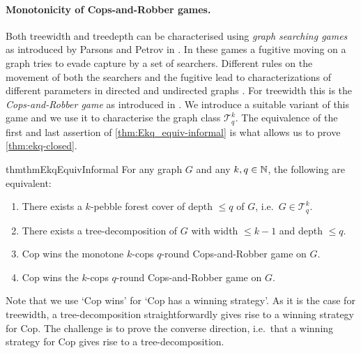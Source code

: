 \documentclass{lmcs}
\theoremstyle{plain}\newtheorem{claim}[thm]{Claim}   %
\newcommand{\NN}{\ensuremath \mathbb{N}}
\newcommand{\cT}{\ensuremath{\mathcal T}}
\newcommand{\Ekq}{\ensuremath{\cT_{q}^{k}}}
\begin{document}
\paragraph{Monotonicity of Cops-and-Robber games.}
Both treewidth and treedepth can be characterised using \emph{graph searching games} as introduced by Parsons and Petrov 
in \cite{Parsons_pursit-evasion_1978,Parsons_searchnumber_1978,Petrov_pursuit_1982}.
In these games a fugitive moving on a graph tries to evade capture by a set of searchers.
Different rules on the movement of both the searchers and the fugitive lead to characterizations of different parameters in directed and undirected graphs \cite{Bienstock_CRgames_1989, Bienstock_pathwidth_1991, Fomin_NCR_2009, Makedon_cutwidth_1989, Mazoit_monotonicity_2008, Johnson_dtw_2001, Nesetril_CRtd_2006, Seymour_graph_1993}.
For treewidth this is the \emph{Cops-and-Robber game} as introduced in \cite{Bienstock_CRgames_1989, Seymour_graph_1993}.
We introduce a suitable variant of this game and we use it to characterise the graph class $\Ekq$.
The equivalence of the first and last assertion of \autoref{thm:Ekq_equiv-informal} is what allows us to prove \autoref{thm:ekq-closed}.

\begin{restatable}{thm}{thmEkqEquivInformal}
	\label{thm:Ekq_equiv-informal}
	For any graph $G$ and any $k,q\in \NN$, the following are equivalent:
	\begin{enumerate}
		\item There exists a $k$-pebble forest cover of depth $\leq q$ of $G$, i.e.\ $G \in \Ekq$.
		\item There exists a tree-decomposition of $G$ with width $\leq k-1$ and depth $\leq q$.
		\item Cop wins the monotone $k$-cops $q$-round Cops-and-Robber game on $G$.
		\item Cop wins the $k$-cops $q$-round Cops-and-Robber game on $G$.
	\end{enumerate}
\end{restatable}

Note that we use `Cop wins' for `Cop has a winning strategy'.
As it is the case for treewidth,
a tree-decomposition straightforwardly gives rise to a winning strategy for Cop.
The challenge is to prove the converse direction, i.e.\ 
that a winning strategy for Cop gives rise to a tree-decomposition.
\end{document}
